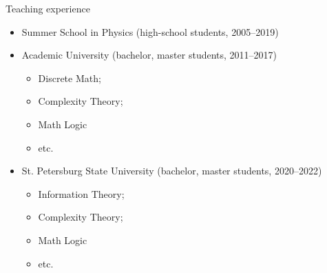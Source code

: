 \begin{frame}{Teaching experience}

    \begin{itemize}
        \item Summer School in Physics (high-school students, 2005--2019)
            \pause
        \item Academic University (bachelor, master students, 2011--2017)
            \begin{itemize}
                \item Discrete Math;
                \item Complexity Theory;
                \item Math Logic
                \item etc.
            \end{itemize}
        \item St. Petersburg State University (bachelor, master students, 2020--2022)
            \begin{itemize}
                \item Information Theory;
                \item Complexity Theory;
                \item Math Logic
                \item etc.
            \end{itemize}
    \end{itemize}
\end{frame}